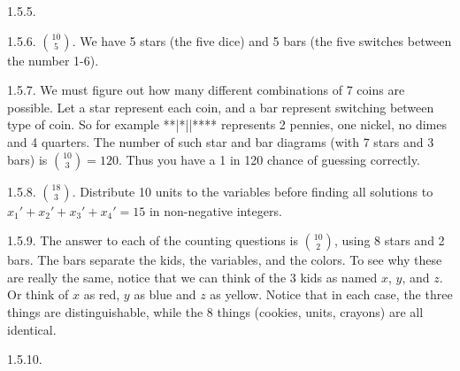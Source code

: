 \begin {itemize}
\begin{ans}{1.5.5.}
	
\end{ans}
\begin{ans}{1.5.6.}
	${10 \choose 5}$.  We have 5 stars (the five dice) and 5 bars (the five switches between the number 1-6).
	
\end{ans}
\begin{ans}{1.5.7.}
	 We must figure out how many different combinations of 7 coins are possible.  Let a star represent each coin, and a bar represent switching between type of coin.  So for example **|*||**** represents 2 pennies, one nickel, no dimes and 4 quarters.  The number of such star and bar diagrams (with 7 stars and 3 bars) is ${10 \choose 3} = 120$.  Thus you have a 1 in 120 chance of guessing correctly.
	
\end{ans}
\begin{ans}{1.5.8.}
	${18 \choose 3}$.  Distribute 10 units to the variables before finding all solutions to $x_1' + x_2' + x_3' + x_4' = 15$ in non-negative integers.
	
\end{ans}
\begin{ans}{1.5.9.}
	  The answer to each of the counting questions is ${10 \choose 2}$, using 8 stars and 2 bars.  The bars separate the kids, the variables, and the colors.  To see why these are really the same, notice that we can think of the 3 kids as named $x$, $y$, and $z$.  Or think of $x$ as red, $y$ as blue and $z$ as yellow.  Notice that in each case, the three things are distinguishable, while the 8 things (cookies, units, crayons) are all identical.
	
\end{ans}
\begin{ans}{1.5.10.}
   \begin{parts}

\end{parts}
\end{ans}
\end{itemize}
